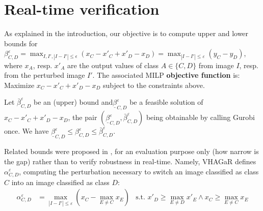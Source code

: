 \section{Real-time verification}

\label{sec.realtime}

As explained in the introduction, our objective is to compute upper and lower bounds for 
$\beta^{\varepsilon}_{C,D} = 
	\max_{I,I', |I-I'| \leq \epsilon}(x_C - x'_C + x'_D - x_D) = 
    \max_{|I-I'| \leq \varepsilon}(y_C - y_D)
$,
where $x_{A}$, resp. $x'_{A}$ are the output values of class $A \in \{C,D\}$  from image $I$, resp. from the perturbed image $I'$.
The associated MILP {\bf objective function} is:
Maximize $x_C - x'_C + x'_D - x_D$ subject to the constraints above.

Let $\bar{\beta}^{\varepsilon}_{C,D}$ be an (upper) bound
and$\underline{\beta}^{\varepsilon}_{C,D}$ be a feasible solution of $x_C - x'_C + x'_D - x_D$, the pair 
$(\underline{\beta}^{\varepsilon}_{C,D} ,\bar{\beta}^{\varepsilon}_{C,D})$ being obtainable by calling Gurobi once. We have $\underline{\beta}^{\varepsilon}_{C,D} \leq \beta^{\varepsilon}_{C,D} \leq \bar{\beta}^{\varepsilon}_{C,D}$.

\iffalse
Related bounds were proposed in \cite{vhagar}, for an evaluation purpose only (how narrow is the gap) rather than to verify robustness in real-time. 
Namely, VHAGaR \cite{vhagar} defines $\alpha^{\varepsilon}_{C,D}$, computing the perturbation necessary to switch an image classified as class $C$ into an image classified as class $D$:
\begin{align*}
	\alpha^{\varepsilon}_{C,D} &= \max_{|I-I'| \leq \varepsilon} (x_C-\max_{E\neq C}x_E) &\text{s.t. }  x'_D \geq \max_{E\neq D}x'_E \wedge x_C \geq \max_{E\neq C}x_E 
\end{align*}

